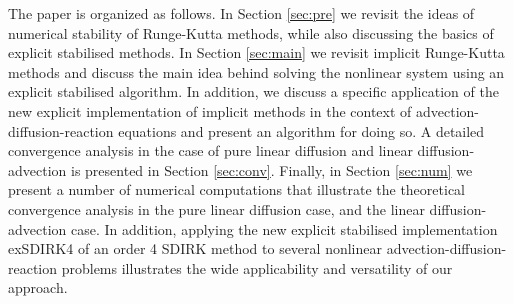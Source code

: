 \documentclass[10pt,a4paper]{article}
\begin{document}
The paper is organized as follows. In Section \ref{sec:pre} we revisit the ideas of numerical stability of Runge-Kutta methods, while also discussing the basics of explicit stabilised methods. In Section \ref{sec:main} we revisit implicit Runge-Kutta methods and discuss the main idea behind solving the nonlinear system using an explicit stabilised algorithm. In addition, we discuss a specific application of the new explicit implementation of implicit methods in the context of advection-diffusion-reaction equations and present an algorithm for doing so. {A detailed convergence analysis {in the case of pure linear diffusion and linear diffusion-advection} is presented in Section \ref{sec:conv}}. %
Finally, in Section \ref{sec:num} we present a number of numerical computations that illustrate the theoretical convergence analysis in the pure linear diffusion case, and the linear diffusion-advection case. {In addition, applying the new explicit stabilised implementation exSDIRK4 of an order 4 SDIRK method to several nonlinear advection-diffusion-reaction problems illustrates the wide applicability and versatility of our approach. }







\end{document}
